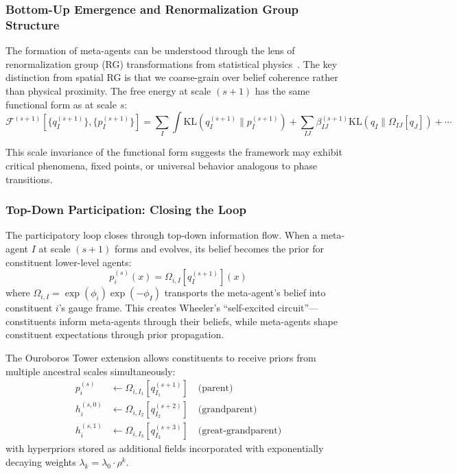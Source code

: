 \documentclass[11pt]{article}
\begin{document}
\subsubsection{Bottom-Up Emergence and Renormalization Group Structure}

The formation of meta-agents can be understood through the lens of renormalization group (RG) transformations from statistical physics~\cite{Wilson1971}. The key distinction from spatial RG is that we coarse-grain over belief coherence rather than physical proximity. The free energy at scale $(s+1)$ has the same functional form as at scale $s$:
\begin{equation}
\mathcal{F}^{(s+1)}[\{q_I^{(s+1)}\}, \{p_I^{(s+1)}\}] = \sum_I \int \mathrm{KL}(q_I^{(s+1)} \| p_I^{(s+1)}) + \sum_{IJ} \beta_{IJ}^{(s+1)} \mathrm{KL}(q_I \| \Omega_{IJ}[q_J]) + \cdots
\end{equation}

This scale invariance of the functional form suggests the framework may exhibit critical phenomena, fixed points, or universal behavior analogous to phase transitions.

\subsubsection{Top-Down Participation: Closing the Loop}

The participatory loop closes through top-down information flow. When a meta-agent $I$ at scale $(s+1)$ forms and evolves, its belief becomes the prior for constituent lower-level agents:
\begin{equation}
p_i^{(s)}(x) = \Omega_{i,I}[q_I^{(s+1)}](x)
\end{equation}
where $\Omega_{i,I} = \exp(\phi_i)\exp(-\phi_I)$ transports the meta-agent's belief into constituent $i$'s gauge frame. This creates Wheeler's ``self-excited circuit''---constituents inform meta-agents through their beliefs, while meta-agents shape constituent expectations through prior propagation.

The Ouroboros Tower extension allows constituents to receive priors from multiple ancestral scales simultaneously:
\begin{align}
p_i^{(s)} &\leftarrow \Omega_{i,I_1}[q_{I_1}^{(s+1)}] \quad \text{(parent)} \\
h_i^{(s,0)} &\leftarrow \Omega_{i,I_2}[q_{I_2}^{(s+2)}] \quad \text{(grandparent)} \\
h_i^{(s,1)} &\leftarrow \Omega_{i,I_3}[q_{I_3}^{(s+3)}] \quad \text{(great-grandparent)}
\end{align}
with hyperpriors stored as additional fields incorporated with exponentially decaying weights $\lambda_k = \lambda_0 \cdot \rho^k$.
\end{document}
